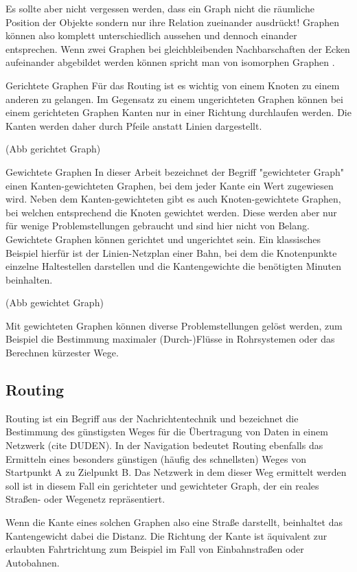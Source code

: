 \documentclass[10pt,a4paper]{article}
\begin{document}
Es sollte aber nicht vergessen werden, dass ein Graph nicht die räumliche Position der Objekte sondern nur ihre Relation zueinander ausdrückt! Graphen können also komplett unterschiedlich aussehen und dennoch einander entsprechen. Wenn zwei Graphen bei gleichbleibenden Nachbarschaften der Ecken aufeinander abgebildet werden können spricht man von isomorphen Graphen \cite[106]{theory}.

Gerichtete Graphen
Für das Routing ist es wichtig von einem Knoten zu einem anderen zu gelangen. Im Gegensatz zu einem ungerichteten Graphen können bei einem gerichteten Graphen Kanten nur in einer Richtung durchlaufen werden. Die Kanten werden daher durch Pfeile anstatt Linien dargestellt. 

(Abb gerichtet Graph)

Gewichtete Graphen
In dieser Arbeit bezeichnet der Begriff "gewichteter Graph" einen Kanten-gewichteten Graphen, bei dem jeder Kante ein Wert zugewiesen wird. Neben dem Kanten-gewichteten gibt es auch Knoten-gewichtete Graphen, bei welchen entsprechend die Knoten gewichtet werden. Diese werden aber nur für wenige Problemstellungen gebraucht und sind hier nicht von Belang. Gewichtete Graphen können gerichtet und ungerichtet sein. Ein klassisches Beispiel hierfür ist der Linien-Netzplan einer Bahn, bei dem die Knotenpunkte einzelne Haltestellen darstellen und die Kantengewichte die benötigten Minuten beinhalten.

(Abb gewichtet Graph)

Mit gewichteten Graphen können diverse Problemstellungen gelöst werden, zum Beispiel die Bestimmung maximaler (Durch-)Flüsse in Rohrsystemen oder das Berechnen kürzester Wege.

\subsection{Routing}

Routing ist ein Begriff aus der Nachrichtentechnik und bezeichnet die Bestimmung des günstigsten Weges für die Übertragung von Daten in einem Netzwerk (cite DUDEN). In der Navigation bedeutet Routing ebenfalls das Ermitteln eines besonders günstigen (häufig des schnellsten) Weges von Startpunkt A zu Zielpunkt B. Das Netzwerk in dem dieser Weg ermittelt werden soll ist in diesem Fall ein gerichteter und gewichteter Graph, der ein reales Straßen- oder Wegenetz repräsentiert.

Wenn die Kante eines solchen Graphen also eine Straße darstellt, beinhaltet das Kantengewicht dabei die Distanz. Die Richtung der Kante ist äquivalent zur erlaubten Fahrtrichtung zum Beispiel im Fall von Einbahnstraßen oder Autobahnen.
\end{document}
